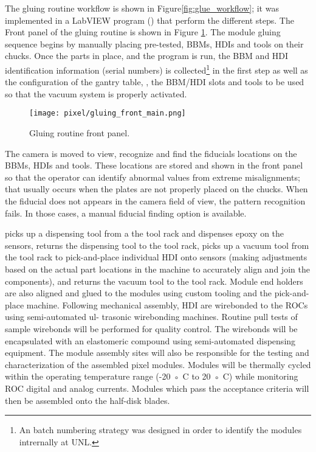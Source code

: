 The gluing routine workflow is shown in Figure\ref{fig:glue_workflow}; it was implemented in a LabVIEW program () that perform the different steps. The Front panel of the gluing routine is shown in Figure \ref{fig:gluing_front_main}. The module gluing sequence begins by manually placing pre-tested, BBMs, HDIs and tools on their chucks. Once the parts in place, and the program is run, the BBM and HDI identification information (serial numbers) is collected\footnote{An batch numbering strategy was designed in order to identify the modules intrernally at UNL.} in the first step as well as the configuration of the gantry table, \ie, the BBM/HDI slots and tools to be used so that the vacuum system is properly activated. 
\begin{landscape}
\hspace{-3cm}
\begin{figure}[h]
\begin{center}
\texttt{[image: pixel/gluing\_front\_main.png]}
\caption[Gluing routine front panel]{Gluing routine front panel.}\label{fig:gluing_front_main}
\end{center}
\end{figure}
\end{landscape}

The camera is moved to view, recognize and find the fiducials locations on the BBMs, HDIs and tools. These locations are stored and shown in the front panel so that the operator can identify abnormal values from extreme misalignments; that usually occurs when the plates are not properly placed on the chucks. When the fiducial does not appears in the camera field of view, the pattern recognition fails. In those cases, a manual fiducial finding option is available. 









picks up a dispensing tool from a the tool rack and dispenses epoxy on the sensors, returns the dispensing tool to the tool rack, picks up a vacuum tool from the tool rack to pick-and-place individual HDI onto sensors (making adjustments based on the actual part locations in the machine to accurately align and join the components), and returns the vacuum tool to the tool rack. Module end holders are also aligned and glued to the modules using custom tooling and the pick-and-place machine. Following mechanical assembly, HDI are wirebonded to the ROCs using semi-automated ul-
trasonic wirebonding machines. Routine pull tests of sample wirebonds will be performed
for quality control. The wirebonds will be encapsulated with an elastomeric compound using
semi-automated dispensing equipment. The module assembly sites will also be responsible for
the testing and characterization of the assembled pixel modules. Modules will be thermally
cycled within the operating temperature range (-20 ◦ C to 20 ◦ C) while monitoring ROC digital
and analog currents. Modules which pass the acceptance criteria will then be assembled onto
the half-disk blades.

